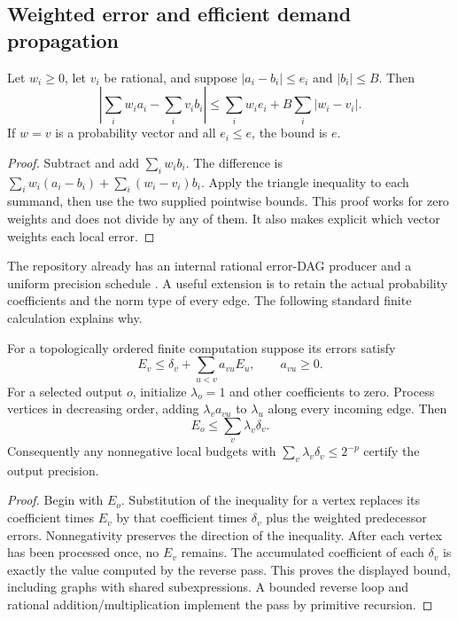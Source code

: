 \subsection{Weighted error and efficient demand propagation}

\begin{lemma}\label{lem:weighted}
Let $w_i\ge0$, let $v_i$ be rational, and suppose
$|a_i-b_i|\le e_i$ and $|b_i|\le B$. Then
\begin{equation}\label{eq:weighted}
 \left|\sum_i w_i a_i-\sum_i v_i b_i\right|
 \le\sum_iw_i e_i+B\sum_i|w_i-v_i|.
\end{equation}
If $w=v$ is a probability vector and all $e_i\le e$, the bound is $e$.
\end{lemma}
\begin{proof}
Subtract and add $\sum_iw_ib_i$. The difference is
$\sum_iw_i(a_i-b_i)+\sum_i(w_i-v_i)b_i$.
Apply the triangle inequality to each summand, then use the two supplied
pointwise bounds. This proof works for zero weights and does not divide by
any of them. It also makes explicit which vector weights each local error.
\end{proof}

The repository already has an internal rational error-DAG producer and a
uniform precision schedule \cite{repo-dag,repo-dag-schedule}. A useful
extension is to retain the actual probability coefficients and the norm
type of every edge. The following standard finite calculation explains why.

\begin{proposition}\label{prop:adjoint}
For a topologically ordered finite computation suppose its errors satisfy
\[
 E_v\le\delta_v+\sum_{u<v}a_{vu}E_u,\qquad a_{vu}\ge0.
\]
For a selected output $o$, initialize $\lambda_o=1$ and other coefficients
to zero. Process vertices in decreasing order, adding
$\lambda_v a_{vu}$ to $\lambda_u$ along every incoming edge. Then
\[
 E_o\le\sum_v\lambda_v\delta_v.
\]
Consequently any nonnegative local budgets with
$\sum_v\lambda_v\delta_v\le2^{-p}$ certify the output precision.
\end{proposition}
\begin{proof}
Begin with $E_o$. Substitution of the inequality for a vertex replaces its
coefficient times $E_v$ by that coefficient times $\delta_v$ plus the
weighted predecessor errors. Nonnegativity preserves the direction of the
inequality. After each vertex has been processed once, no $E_v$ remains.
The accumulated coefficient of each $\delta_v$ is exactly the value
computed by the reverse pass. This proves the displayed bound, including
graphs with shared subexpressions. A bounded reverse loop and rational
addition/multiplication implement the pass by primitive recursion.
\end{proof}

